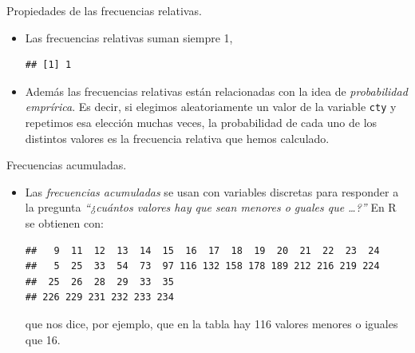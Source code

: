 \documentclass[
  9pt,
  ignorenonframetext,
]{beamer}
\newenvironment{Shaded}{\begin{snugshade}}{\end{snugshade}}
\newcommand{\KeywordTok}[1]{\textcolor[rgb]{0.13,0.29,0.53}{\textbf{#1}}}
\newcommand{\NormalTok}[1]{#1}
\newcommand{\OperatorTok}[1]{\textcolor[rgb]{0.81,0.36,0.00}{\textbf{#1}}}
\begin{document}
\begin{frame}[fragile]

\begin{block}{Propiedades de las frecuencias relativas.}

\begin{itemize}
\item
  Las frecuencias relativas suman siempre 1,

\begin{Shaded}
\end{Shaded}

\begin{verbatim}
## [1] 1
\end{verbatim}
\item
  Además las frecuencias relativas están relacionadas con la idea de
  \emph{probabilidad emprírica}. Es decir, si elegimos aleatoriamente un
  valor de la variable \texttt{cty} y repetimos esa elección muchas
  veces, la probabilidad de cada uno de los distintos valores es la
  frecuencia relativa que hemos calculado.
\end{itemize}

\end{block}

\begin{block}{Frecuencias acumuladas.}

\begin{itemize}
\item
  Las \emph{frecuencias acumuladas} se usan con variables discretas para
  responder a la pregunta \emph{``¿cuántos valores hay que sean menores
  o guales que \ldots{}?''} En R se obtienen con:

\begin{Shaded}
\end{Shaded}

\begin{verbatim}
##   9  11  12  13  14  15  16  17  18  19  20  21  22  23  24 
##   5  25  33  54  73  97 116 132 158 178 189 212 216 219 224 
##  25  26  28  29  33  35 
## 226 229 231 232 233 234
\end{verbatim}

  que nos dice, por ejemplo, que en la tabla hay 116 valores menores o
  iguales que 16.
\end{itemize}

\end{block}

\end{frame}
\end{document}
